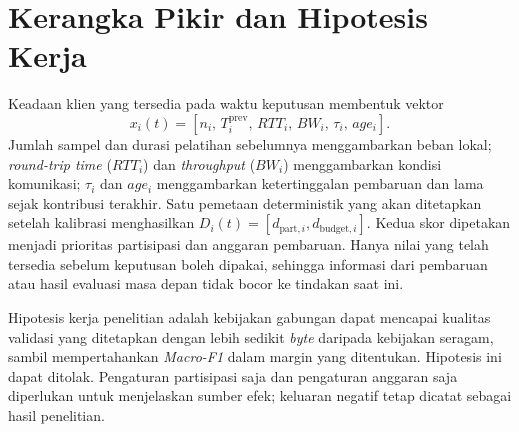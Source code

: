 \section{Kerangka Pikir dan Hipotesis Kerja}
Keadaan klien yang tersedia pada waktu keputusan membentuk vektor
\begin{equation}
  x_i(t)=\left[n_i,\,T_i^{\mathrm{prev}},\,RTT_i,\,BW_i,\,\tau_i,\,age_i\right].
\end{equation}
Jumlah sampel dan durasi pelatihan sebelumnya menggambarkan beban lokal; \textit{round-trip time} ($RTT_i$) dan \textit{throughput} ($BW_i$) menggambarkan kondisi komunikasi; $\tau_i$ dan $age_i$ menggambarkan ketertinggalan pembaruan dan lama sejak kontribusi terakhir. Satu pemetaan deterministik yang akan ditetapkan setelah kalibrasi menghasilkan $D_i(t)=[d_{\mathrm{part},i},d_{\mathrm{budget},i}]$. Kedua skor dipetakan menjadi prioritas partisipasi dan anggaran pembaruan. Hanya nilai yang telah tersedia sebelum keputusan boleh dipakai, sehingga informasi dari pembaruan atau hasil evaluasi masa depan tidak bocor ke tindakan saat ini.

Hipotesis kerja penelitian adalah kebijakan gabungan dapat mencapai kualitas validasi yang ditetapkan dengan lebih sedikit \textit{byte} daripada kebijakan seragam, sambil mempertahankan \textit{Macro-F1} dalam margin yang ditentukan. Hipotesis ini dapat ditolak. Pengaturan partisipasi saja dan pengaturan anggaran saja diperlukan untuk menjelaskan sumber efek; keluaran negatif tetap dicatat sebagai hasil penelitian.
